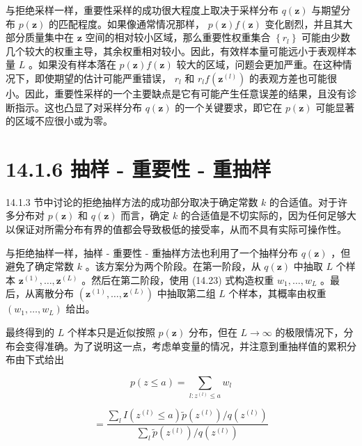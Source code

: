 \documentclass[10pt]{article}
\begin{document}
与拒绝采样一样，重要性采样的成功很大程度上取决于采样分布 \(q\left( \mathbf{z}\right)\) 与期望分布 \(p\left( \mathbf{z}\right)\) 的匹配程度。如果像通常情况那样， \(p\left( \mathbf{z}\right) f\left( \mathbf{z}\right)\) 变化剧烈，并且其大部分质量集中在 \(\mathbf{z}\) 空间的相对较小区域，那么重要性权重集合 \(\left\{  {r}_{l}\right\}\) 可能由少数几个较大的权重主导，其余权重相对较小。因此，有效样本量可能远小于表观样本量 \(L\) 。如果没有样本落在 \(p\left( \mathbf{z}\right) f\left( \mathbf{z}\right)\) 较大的区域，问题会更加严重。在这种情况下，即使期望的估计可能严重错误， \({r}_{l}\) 和 \({r}_{l}f\left( {\mathbf{z}}^{\left( l\right) }\right)\) 的表观方差也可能很小。因此，重要性采样的一个主要缺点是它有可能产生任意误差的结果，且没有诊断指示。这也凸显了对采样分布 \(q\left( \mathbf{z}\right)\) 的一个关键要求，即它在 \(p\left( \mathbf{z}\right)\) 可能显著的区域不应很小或为零。

\section*{14.1.6 抽样 - 重要性 - 重抽样}

14.1.3 节中讨论的拒绝抽样方法的成功部分取决于确定常数 \(k\) 的合适值。对于许多分布对 \(p\left( \mathbf{z}\right)\) 和 \(q\left( \mathbf{z}\right)\) 而言，确定 \(k\) 的合适值是不切实际的，因为任何足够大以保证对所需分布有界的值都会导致极低的接受率，从而不具有实际可操作性。

与拒绝抽样一样，抽样 - 重要性 - 重抽样方法也利用了一个抽样分布 \(q\left( \mathbf{z}\right)\) ，但避免了确定常数 \(k\) 。该方案分为两个阶段。在第一阶段，从 \(q\left( \mathbf{z}\right)\) 中抽取 \(L\) 个样本 \({\mathbf{z}}^{\left( 1\right) },\ldots ,{\mathbf{z}}^{\left( L\right) }\) 。然后在第二阶段，使用 (14.23) 式构造权重 \({w}_{1},\ldots ,{w}_{L}\) 。最后，从离散分布 \(\left( {{\mathbf{z}}^{\left( 1\right) },\ldots ,{\mathbf{z}}^{\left( L\right) }}\right)\) 中抽取第二组 \(L\) 个样本，其概率由权重 \(\left( {{w}_{1},\ldots ,{w}_{L}}\right)\) 给出。

最终得到的 \(L\) 个样本只是近似按照 \(p\left( \mathbf{z}\right)\) 分布，但在 \(L \rightarrow  \infty\) 的极限情况下，分布会变得准确。为了说明这一点，考虑单变量的情况，并注意到重抽样值的累积分布由下式给出

\[
p\left( {z \leq  a}\right)  = \mathop{\sum }\limits_{{l : {z}^{\left( l\right) } \leq  a}}{w}_{l}
\]

\[
= \frac{\mathop{\sum }\limits_{l}I\left( {{z}^{\left( l\right) } \leq  a}\right) \widetilde{p}\left( {z}^{\left( l\right) }\right) /q\left( {z}^{\left( l\right) }\right) }{\mathop{\sum }\limits_{l}\widetilde{p}\left( {z}^{\left( l\right) }\right) /q\left( {z}^{\left( l\right) }\right) } \tag{14.24}
\]
\end{document}
